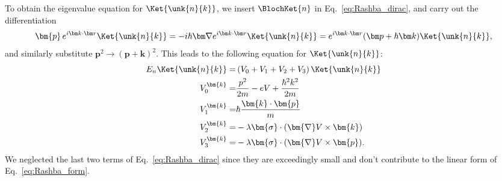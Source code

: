 To obtain the eigenvalue equation for $\Ket{\unk{n}{k}}$, we insert $\BlochKet{n}$ in Eq.~\ref{eq:Rashba_dirac}, and carry out the differentiation
\begin{equation}
\bm{p} \, \Eikr\Ket{\unk{n}{k}} = -i \hbar \bm \nabla \Eikr\Ket{\unk{n}{k}} = \Eikr(\bm p + \hbar \bm k)\Ket{\unk{n}{k}},
\end{equation}
and similarly substitute $\bm{p}^2 \rightarrow (\bm{p}+\bm{k})^2$.
This leads to the following equation for $\Ket{\unk{n}{k}}$:
\begin{align}
	\label{eq:Rashba_unk_Vs}
	E_n \Ket{\unk{n}{k}} =& \left(V_0 + V_1  +  V_2 + V_3 \right) \Ket{\unk{n}{k}} \\
	V_0^{\bm{k}} =& \frac{p^2}{2m} - eV + \frac{\hbar^2 k^2}{2m} \\
	V_1^{\bm{k}} =& \hbar\frac{\bm{k}\cdot\bm{p}}{m} \\
	V_2^{\bm{k}} =& -\lambda \bm{\sigma} \cdot ( \bm{\nabla}V \times \bm{k}) \\
	V_3^{\bm{k}} =& -\lambda \bm{\sigma} \cdot ( \bm{\nabla}V \times \bm{p}).
\end{align}
We neglected the last two terms of Eq.~\ref{eq:Rashba_dirac} since they are exceedingly small and don't contribute to the linear form of Eq.~\ref{eq:Rashba_form}.

